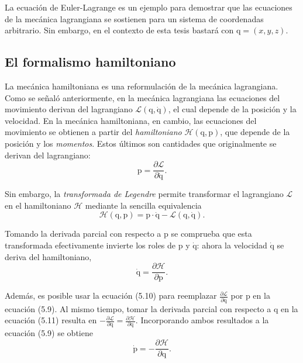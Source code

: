 La ecuación de Euler-Lagrange es un ejemplo para demostrar que las ecuaciones de la mecánica lagrangiana se sostienen para un sistema de coordenadas arbitrario. Sin embargo, en el contexto de esta tesis bastará con $\boldsymbol{\mathrm{q}} = (x, y, z)$.

\subsection{El formalismo hamiltoniano}

La mecánica hamiltoniana es una reformulación de la mecánica lagrangiana. Como se señaló anteriormente, en la mecánica lagrangiana las ecuaciones del movimiento derivan del lagrangiano $\mathcal{L}(\boldsymbol{\mathrm{q}}, \boldsymbol{\dot{\mathrm{q}}})$, el cual depende de la posición y la velocidad. En la mecánica hamiltoniana, en cambio, las ecuaciones del movimiento se obtienen a partir del \textit{hamiltoniano} $\mathcal{H}(\boldsymbol{\mathrm{q}}, \boldsymbol{\mathrm{p}})$, que depende de la posición y los \textit{momentos}. Estos últimos son cantidades que originalmente se derivan del lagrangiano:
\begin{equation}
\boldsymbol{\mathrm{p}} = \frac{\partial\mathcal{L}}{\partial\boldsymbol{\dot{\mathrm{q}}}}.
\end{equation}

\noindent
Sin embargo, la \textit{transformada de Legendre} permite transformar el lagrangiano $\mathcal{L}$ en el hamiltoniano $\mathcal{H}$ mediante la sencilla equivalencia
\begin{equation}
\mathcal{H}(\boldsymbol{\mathrm{q}}, \boldsymbol{\mathrm{p}}) = \boldsymbol{\mathrm{p}} \cdot \boldsymbol{\mathrm{\dot{q}}} - \mathcal{L}(\boldsymbol{\mathrm{q}}, \boldsymbol{\dot{\mathrm{q}}}).
\end{equation}

\noindent
Tomando la derivada parcial con respecto a $\boldsymbol{\mathrm{p}}$ se comprueba que esta transformada efectivamente invierte los roles de $\boldsymbol{\mathrm{p}}$ y $\boldsymbol{\dot{\mathrm{q}}}$: ahora la velocidad $\boldsymbol{\dot{\mathrm{q}}}$ se deriva del hamiltoniano,
\begin{equation}
\boldsymbol{\dot{\mathrm{q}}} = \frac{\partial \mathcal{H}}{\partial \boldsymbol{\mathrm{p}}}.
\end{equation}

\noindent
Además, es posible usar la ecuación (5.10) para reemplazar $\frac{\partial \mathcal{L}}{\partial \boldsymbol{\dot{\mathrm{q}}}}$ por $\boldsymbol{\mathrm{p}}$ en la ecuación (5.9). Al mismo tiempo, tomar la derivada parcial con respecto a $\boldsymbol{\mathrm{q}}$ en la ecuación (5.11) resulta en $-\frac{\partial \mathcal{L}}{\partial \boldsymbol{\mathrm{q}}} = \frac{\partial \mathcal{H}}{\partial \boldsymbol{\mathrm{q}}}$. Incorporando ambos resultados a la ecuación (5.9) se obtiene
\begin{equation}
\boldsymbol{\dot{\mathrm{p}}} = -\frac{\partial \mathcal{H}}{\partial \boldsymbol{\mathrm{q}}}.
\end{equation}

